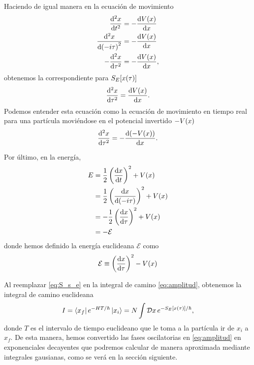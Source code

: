Haciendo de igual manera en la ecuación de movimiento
\begin{align}
	\dv[2]{x}{t} &= -\dv{V(x)}{x} \\
	\dv[2]{x}{\qty(-i\tau)} &= -\dv{V(x)}{x} \\
	-\dv[2]{x}{\tau} &= -\dv{V(x)}{x},
\end{align}
obtenemos la correspondiente para  $S_E\qty[x\qty(\tau)]$
\begin{equation}\label{eq:mov_ec}
\dv[2]{x}{\tau} = \dv{V(x)}{x}.
\end{equation}
Podemos entender esta ecuación como la ecuación de movimiento en tiempo real para una partícula moviéndose en el potencial invertido $-V\qty(x)$
\begin{equation}
\dv[2]{x}{\tau} = -\dv{\qty(-V(x))}{x}.
\end{equation}
 
Por último, en la energía, 
\begin{align}
	E &= \frac{1}{2} \left(\dv{x}{t}\right)^2 + V\qty(x) \\
	&= \frac{1}{2} \left(\dv{x}{\qty(-i\tau)}\right)^2 + V\qty(x) \\
	&= -\frac{1}{2} \left(\dv{x}{\tau}\right)^2 + V\qty(x) \\
	&= -\mathcal{E}
\end{align}
donde hemos definido la energía euclideana $\mathcal{E}$ como \cite{rubakov2009classical}
\begin{equation}
	\mathcal{E}  \equiv \left(\dv{x}{\tau}\right)^2 - V\qty(x)
\end{equation}

Al reemplazar \eqref{eq:S_s_e} en la integral de camino \eqref{eq:amplitud}, obtenemos la integral de camino euclideana \cite{das2006field}
\begin{equation}\label{eq:amplitud_euc}
I = \bra{x_f}e^{-HT/\hbar}\ket{x_i} = N \int \mathcal{D}x \, e^{-S_E\qty[x\qty(\tau)]/\hbar},
\end{equation}
donde $T$ es el intervalo de tiempo euclideano que le toma a la partícula ir de $x_i$ a $x_f$. De esta manera, hemos convertido las fases oscilatorias en \eqref{eq:amplitud} en exponenciales decayentes que podremos calcular de manera aproximada mediante integrales gausianas, como se verá en la sección siguiente.

